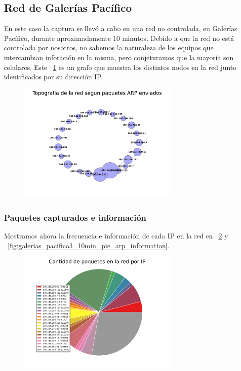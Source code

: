 \subsection{Red de Galerías Pacífico}
En este caso la captura se llevó a cabo en una red no controlada, en Galerías Pacífico, durante aproximadamente 10 minutos.
Debido a que la red no está controlada por nosotros, no sabemos la naturaleza de los equipos que intercambian inforación en la misma, pero conjeturamos que la mayoría son celulares. Este ~\ref{fig:galerias_pacifico3_10min_network} es un grafo que muestra los distintos nodos en la red junto identificados por su dirección IP.

\begin{figure}[h!]
  \centering
   \includegraphics[width=0.7\textwidth]{graficos/galerias_pacifico3_10min_network.png}
  \caption{}
  \label{fig:galerias_pacifico3_10min_network}
\end{figure}
\FloatBarrier

\subsubsection{Paquetes capturados e información}
Mostramos ahora la frecuencia e información de cada IP en la red en ~\ref{fig:galerias_pacifico3_10min_pie_arp} y ~\ref{fig:galerias_pacifico3_10min_pie_arp_information}.


\begin{figure}[h!]
  \centering
   \includegraphics[width=0.7\textwidth]{graficos/galerias_pacifico3_10min_pie_arp.png}
  \caption{}
  \label{fig:galerias_pacifico3_10min_pie_arp}
\end{figure}


